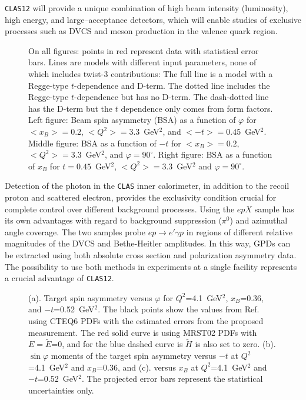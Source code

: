 {\tt CLAS12} will provide a unique combination of high beam intensity 
(luminosity), high energy, and large--acceptance detectors, which will 
enable studies of exclusive processes such as DVCS and meson production 
in the valence quark region.

\begin{figure}[ht]
\centerline{}
\caption{\small{On all figures: points in red represent data with statistical 
error bars. Lines are models with different input parameters, none of which 
includes twist-3 contributions:  The full line is a model with a Regge-type 
$t$-dependence and D-term. The dotted line includes the Regge-type 
$t$-dependence but has no D-term. The dash-dotted line has the D-term but the 
$t$ dependence only comes from form factors. Left figure: Beam spin asymmetry 
(BSA) as a function of $\varphi$ for $<x_B>=0.2$, $<Q^2>=3.3$~GeV$^2$, and 
$<-t>=0.45$~GeV$^2$. Middle figure: BSA as a function of $-t$ for $<x_B>=0.2$, 
$<Q^2>=3.3$~GeV$^2$, and $\varphi=90^\circ$. Right figure: BSA as a function 
of $x_B$ for $t=0.45$~GeV$^2$, $<Q^2>=3.3$~GeV$^2$ and $\varphi=90^\circ$.}}
\label{fig:asymbig}
\end{figure}

Detection of the photon in the {\tt CLAS} inner calorimeter, in addition 
to the recoil proton and scattered electron, provides the exclusivity 
condition crucial for complete control over different background processes. 
Using the $epX$ sample  has its own advantages with regard to background 
suppression ($\pi^0$) and azimuthal angle coverage.  The two samples probe 
$ep \to e'\gamma p$ in regions of different relative magnitudes of the DVCS 
and Bethe-Heitler amplitudes.  In this way, GPDs can be extracted using both 
absolute cross section and polarization asymmetry data. The possibility to 
use both methods in experiments at a single facility represents a crucial 
advantage of {\tt CLAS12}.

\begin{figure}[ht]
\begin{center}
\caption{\small{(a). Target spin asymmetry versus $\varphi$ for 
$Q^2$=4.1~GeV$^2$, $x_B$=0.36, and $-t$=0.52~GeV$^2$. The black points show 
the values from Ref.~\cite{Vanderhaeghen:1999xj} using CTEQ6 PDFs with the 
estimated errors from the proposed measurement. The red solid curve is using 
MRST02 PDFs with $E=\widetilde{E}$=0, and for the blue dashed curve is 
$\widetilde{H}$ is also set to zero. (b). $\sin{\varphi}$ moments of the 
target spin asymmetry versus $-t$ at $Q^2$=4.1~GeV$^2$ and $x_B$=0.36, and 
(c). versus $x_B$ at $Q^2$=4.1~GeV$^2$ and $-t$=0.52~GeV$^2$. The projected 
error bars represent the statistical uncertainties only.}} 
\label{Fig:TsaPhiComp}
\end{center}
\end{figure}

